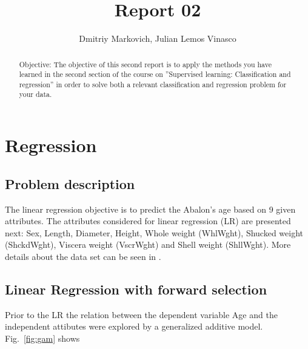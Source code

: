 \documentclass[10pt, paper=a4]{article}
\begin{document}
\title{Report 02}

\author{Dmitriy Markovich, Julian Lemos Vinasco}

\date{}

\maketitle

\begin{abstract}
  Objective: The objective of this second report is to apply the
  methods you have learned in the second section of the course on
  ”Supervised learning: Classification and regression” in order to
  solve both a relevant classification and regression problem for your
  data.
\end{abstract}

\section{Regression}
\label{sec:regression}

\subsection{Problem description}
The linear regression objective is to predict the Abalon's age based on 9 given attributes. The attributes considered for linear regression (LR) are presented next: Sex, Length, Diameter, Height, Whole weight (WhlWght), Shucked weight (ShckdWght), Viscera weight (VscrWght) and Shell weight (ShllWght). More details about the data set can be seen in \cite{datadescription}.

\subsection{Linear Regression with forward selection}
Prior to the LR the relation between the dependent variable Age and the independent attibutes were explored by a generalized additive model. Fig.~\ref{fig:gam} shows 
\end{document}
